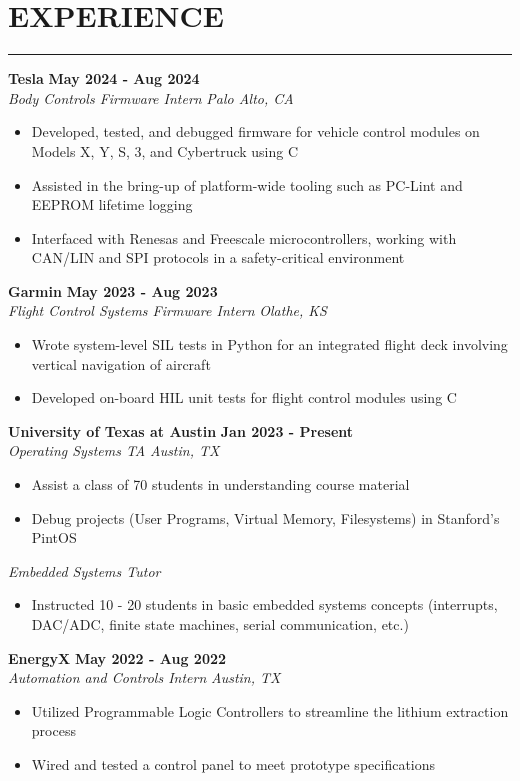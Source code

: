 \documentclass{article}
\newcommand{\sectionHeader}[1]{%
    \vspace{-1.5\baselineskip}
    \section*{\MakeUppercase{\large #1}} %
    \vspace{-1.75\baselineskip}
    \color{teal}
    \rule{\textwidth}{2pt} %
    \color{black}
    \vspace{-1.5\baselineskip}
    \pdfbookmark[1]{#1}{#1}
}
\newcommand{\role}[3]{
    \textit{#1} \hfill \textit{#2} \\[0pt]
    #3
}
\newcommand{\sectionItem}[5]{ %
    \textbf{#1} \hfill \textbf{#2} \\[0pt]
    \role{#3}{#4}{#5}    %
}
\begin{document}
\sectionHeader{experience}
\begin{flushleft}
    \sectionItem{Tesla}{May 2024 - Aug 2024}{Body Controls Firmware Intern}{Palo Alto, CA}{
        \begin{itemize}
            \item Developed, tested, and debugged firmware for vehicle control modules on Models X, Y, S, 3, and Cybertruck using C
            \item Assisted in the bring-up of platform-wide tooling such as PC-Lint and EEPROM lifetime logging
            \item Interfaced with Renesas and Freescale microcontrollers, working with CAN/LIN and SPI protocols in a safety-critical environment
        \end{itemize}   
    }
    
    \sectionItem{Garmin}{May 2023 - Aug 2023}{Flight Control Systems Firmware Intern}{Olathe, KS}{
        \begin{itemize}
            \item Wrote system-level SIL tests in Python for an integrated flight deck involving vertical navigation of aircraft
            \item Developed on-board HIL unit tests for flight control modules using C
        \end{itemize}
    }

    \sectionItem{University of Texas at Austin}{Jan 2023 - Present}{Operating Systems TA}{Austin, TX}{
        \begin{itemize}
            \item Assist a class of 70 students in understanding course material
            \item Debug projects (User Programs, Virtual Memory, Filesystems) in Stanford's PintOS
        \end{itemize}
        \role{Embedded Systems Tutor}{}{
            \begin{itemize}
                \item Instructed 10 - 20 students in basic embedded systems concepts (interrupts, DAC/ADC, finite state machines, serial communication, etc.)
            \end{itemize}
        }
    }

    \sectionItem{EnergyX}{May 2022 - Aug 2022}{Automation and Controls Intern}{Austin, TX}{
        \begin{itemize}
            \item Utilized Programmable Logic Controllers to streamline the lithium extraction process
            \item Wired and tested a control panel to meet prototype specifications
        \end{itemize}
    }
\end{flushleft}
\end{document}
